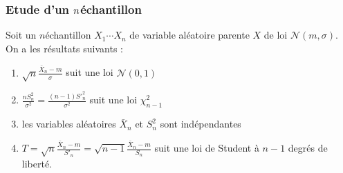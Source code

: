 \documentclass[letterpaper,10pt,french]{sphinxmanual}
\begin{document}
\subsubsection{Etude d’un \protect\(n\protect\)\sphinxhyphen{}échantillon}
\label{\detokenize{elemstats:etude-d-un-n-echantillon}}
\sphinxAtStartPar
Soit un \(n\)\sphinxhyphen{}échantillon \(X_1\cdots X_n\) de variable aléatoire parente \(X\) de loi \(\mathcal{N}(m,\sigma)\). On a les résultats suivants :
\begin{enumerate}
%
\item {} 
\sphinxAtStartPar
\(\sqrt{n} \frac{\bar{X}_n-m}{\sigma}\) suit une loi \(\mathcal{N}(0,1)\)

\item {} 
\sphinxAtStartPar
\(\frac{nS_n^2}{\sigma^2} = \frac{(n-1)S'^2_n}{\sigma^2}\) suit une loi \(\chi^2_{n-1}\)

\item {} 
\sphinxAtStartPar
les variables aléatoires \(\bar{X}_n\) et \(S_n^2\) sont indépendantes

\item {} 
\sphinxAtStartPar
\(T=\sqrt{n}\frac{\bar{X}_n-m}{S'_n}=\sqrt{n-1}\frac{\bar{X}_n-m}{S_n}\) suit une loi de Student à \(n-1\) degrés de liberté.

\end{enumerate}
\end{document}
